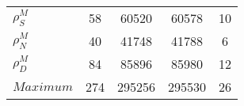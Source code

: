 \begin{center}
\begin{longtable}{lcccc}
$ {\rho^{M}_{S}}       $	 & 	                   58	 & 	                60520	 & 	                60578	 & 	                   10 \\ 
$ {\rho^{M}_{N}}       $	 & 	                   40	 & 	                41748	 & 	                41788	 & 	                    6 \\ 
$ {\rho^{M}_{D}}       $	 & 	                   84	 & 	                85896	 & 	                85980	 & 	                   12 \\ 
$Maximum               $	 & 	                  274	 & 	               295256	 & 	               295530	 & 	                   26 \\ 
\end{longtable}
 \end{center}
